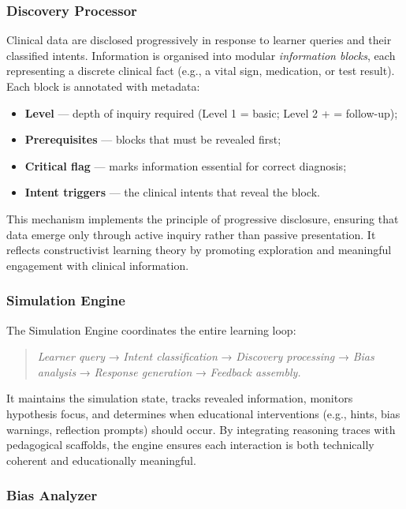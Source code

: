 \subsubsection{Discovery Processor}

Clinical data are disclosed progressively in response to learner queries and
their classified intents.
Information is organised into modular \textit{information blocks}, each
representing a discrete clinical fact (e.g., a vital sign, medication, or test
result).
Each block is annotated with metadata:

\begin{itemize}
  \item \textbf{Level} — depth of inquiry required
  (Level 1 = basic; Level 2 + = follow-up);
  \item \textbf{Prerequisites} — blocks that must be revealed first;
  \item \textbf{Critical flag} — marks information essential for correct
  diagnosis;
  \item \textbf{Intent triggers} — the clinical intents that reveal the block.
\end{itemize}

This mechanism implements the principle of progressive disclosure, ensuring that
data emerge only through active inquiry rather than passive presentation.
It reflects constructivist learning theory by promoting exploration and
meaningful engagement with clinical information.

\subsubsection{Simulation Engine}

The Simulation Engine coordinates the entire learning loop:

\begin{quote}
\textit{Learner query} → \textit{Intent classification} → \textit{Discovery
processing} → \textit{Bias analysis} → \textit{Response generation} →
\textit{Feedback assembly.}
\end{quote}

It maintains the simulation state, tracks revealed information, monitors
hypothesis focus, and determines when educational interventions (e.g., hints,
bias warnings, reflection prompts) should occur.
By integrating reasoning traces with pedagogical scaffolds, the engine ensures
each interaction is both technically coherent and educationally meaningful.

\subsubsection{Bias Analyzer}

